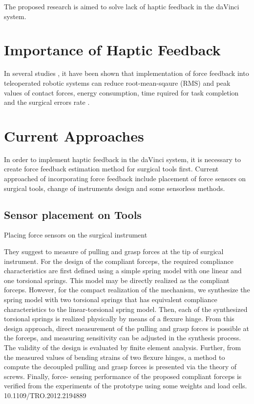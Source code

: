 The proposed research is aimed to solve lack of haptic feedback in the daVinci system.




\section{Importance of Haptic Feedback}
\label{sec:hapticFeedbackImportance}

In several studies \cite{lim_role_2015, alleblas_effects_2017, currie_role_2017}, it have been shown that implementation of force feedback into teleoperated robotic systems can reduce root-mean-sqaure (RMS) and peak values of contact forces, energy consumption, time rquired for task completion and the surgical errors rate \cite{tavakoli_haptics_2008}.

\section{Current Approaches}
\label{sec:CurAppr}

In order to implement haptic feedback in the daVinci system, it is necessary to create force feedback estimation method for surgical tools first. Current approached of incorporating force feedback include placement of force sensors on surgical tools, change of instruments design and some sensorless methods.

\subsection{Sensor placement on Tools}
Placing force sensors on the surgical instrument \cite{hong_design_2012}

They suggest to measure of pulling and grasp forces at the tip of surgical instrument. For the design of the compliant forceps, the required compliance characteristics are first defined using a simple spring model with one linear and one torsional springs. This model may be directly realized as the compliant forceps. However, for the compact realization of the mechanism, we synthesize the spring model with two torsional springs that has equivalent compliance characteristics to the linear-torsional spring model. Then, each of the synthesized torsional springs is realized physically by means of a flexure hinge. From this design approach, direct measurement of the pulling and grasp forces is possible at the forceps, and measuring sensitivity can be adjusted in the synthesis process. The validity of the design is evaluated by finite element analysis. Further, from the measured values of bending strains of two flexure hinges, a method to compute the decoupled pulling and grasp forces is presented via the theory of screws. Finally, force- sensing performance of the proposed compliant forceps is verified from the experiments of the prototype using some weights and load cells. 10.1109/TRO.2012.2194889 

